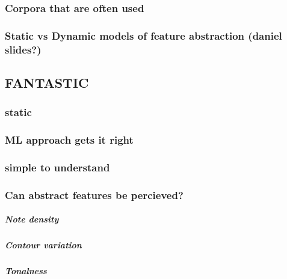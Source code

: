 \documentclass[]{book}
\let\oldsubparagraph\subparagraph
\renewcommand{\subparagraph}[1]{\oldsubparagraph{#1}\mbox{}}
\theoremstyle{definition}
\theoremstyle{definition}
\theoremstyle{definition}
\theoremstyle{remark}
\begin{document}
\hypertarget{corpora-that-are-often-used}{%
\subsubsection{Corpora that are often
used}\label{corpora-that-are-often-used}}

\hypertarget{static-vs-dynamic-models-of-feature-abstraction-daniel-slides}{%
\subsubsection{Static vs Dynamic models of feature abstraction (daniel
slides?)}\label{static-vs-dynamic-models-of-feature-abstraction-daniel-slides}}

\hypertarget{fantastic}{%
\subsection{FANTASTIC}\label{fantastic}}

\hypertarget{static}{%
\subsubsection{static}\label{static}}

\hypertarget{ml-approach-gets-it-right}{%
\subsubsection{ML approach gets it
right}\label{ml-approach-gets-it-right}}

\hypertarget{simple-to-understand}{%
\subsubsection{simple to understand}\label{simple-to-understand}}

\hypertarget{can-abstract-features-be-percieved}{%
\subsubsection{Can abstract features be
percieved?}\label{can-abstract-features-be-percieved}}

\hypertarget{note-density}{%
\subparagraph{Note density}\label{note-density}}

\hypertarget{contour-variation}{%
\subparagraph{Contour variation}\label{contour-variation}}

\hypertarget{tonalness}{%
\subparagraph{Tonalness}\label{tonalness}}
\end{document}

